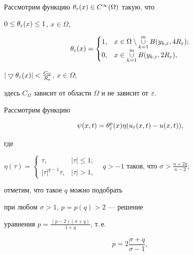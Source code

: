 \begin{pf}


Рассмотрим функцию $\theta_\varepsilon(x)\in C^\infty(\Omega)$ такую, что


$0\le\theta_\varepsilon(x)\le 1$, $x\in\Omega$,


$$


\theta_\eps(x) =


\begin{cases}


1,& x\in \Omega\setminus \mathop{\cup}\limits_{k=1}^m B(y_{k,\varepsilon},4R_\eps); \\


0,& x\in \mathop{\cup}\limits_{k=1}^m B(y_{k,\varepsilon},2R_\eps),


\end{cases}


$$


$|\bigtriangledown\theta_\varepsilon(x)|<\frac{C_\Omega}{R_\varepsilon}$, $x\in\Omega$;


здесь $C_\Omega$ зависит от области $\Omega$ и не зависит от $\varepsilon$.





Рассмотрим функцию


\begin{equation}


\psi(x,t)=\theta_\eps^p(x)\eta(u_\eps(x,t)-u(x,t)), \label{psi}


\end{equation}


где


$\eta(\tau)=


\begin{cases}


\tau, &|\tau|\le 1;\\


|\tau|^{q-1}\tau, &|\tau|>1,


\end{cases}


$ \ $q>-1$ таков, что $\sigma>\frac{n+2q}{n-2}$;


отметим, что такое $q$ можно подобрать


при любом $\sigma>1$, $p=p(q)>2$ --- решение 


уравнения $p=\frac{(p-2)(\sigma+q)}{1+q}$, т.\,е.


\begin{equation}


p=2\frac{\sigma+q}{\sigma-1}, \label{8}


\end{equation}



\end{pf}
